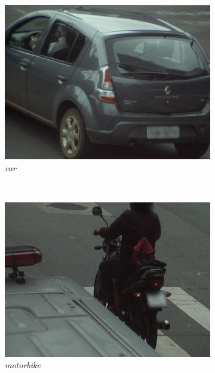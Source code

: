 \documentclass[12pt,oneside]{memoir}
\begin{document}
\begin{figure}
    \centering
    \begin{subfigure}[b]{0.48\textwidth}
        \includegraphics[width=\textwidth]{matfmaster/glava3/car.jpg}
        \caption{\textit{car}}
        \label{fig:section3_car}
    \end{subfigure}
    ~
    \begin{subfigure}[b]{0.48\textwidth}
        \includegraphics[width=\textwidth]{matfmaster/glava3/bike.jpg}
        \caption{\textit{motorbike}}
        \label{fig:section3_motorbike}
    \end{subfigure}
    ~
    \begin{subfigure}[b]{0.48\textwidth}

\end{subfigure}
\end{figure}
\end{document}
